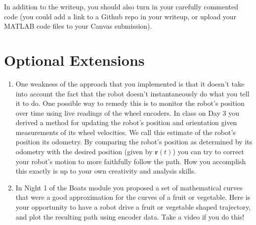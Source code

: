 \documentclass{tufte-handout}
\begin{document}
In addition to the writeup, you should also turn in your carefully commented code (you could add a link to a Github repo in your writeup, or upload your MATLAB code files to your Canvas submission).

\section{Optional Extensions}

\begin{enumerate}[series=extension, label=\textbf{Extension} (\arabic*)]
\item One weakness of the approach that you implemented is that it doesn't take into account the fact that the robot doesn't instantaneously do what you tell it to do.  One possible way to remedy this is to monitor the robot's position over time using live readings of the wheel encoders.  In class on Day 3 you derived a method for updating the robot's position and orientation given measurements of its wheel velocities.  We call this estimate of the robot's position its odometry.  By comparing the robot's position as determined by its odometry with the desired position (given by $\mathbf{r}(t)$) you can try to correct your robot's motion to more faithfully follow the path.  How you accomplish this exactly is up to your own creativity and analysis skills.

\item In Night 1 of the Boats module you proposed a set of mathematical curves that were a good approximation for the curves of a fruit or vegetable. Here is your opportunity to have a robot drive a fruit or vegetable shaped trajectory, and plot the resulting path using encoder data. Take a video if you do this!

\end{enumerate}
\end{document}

